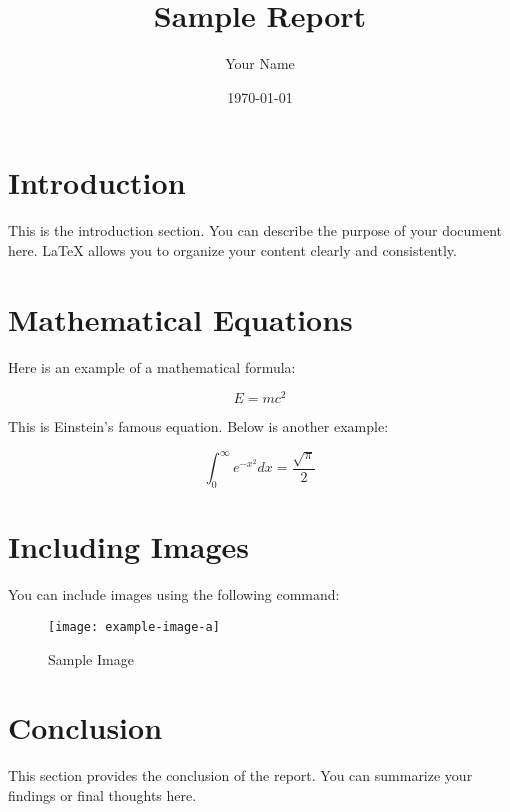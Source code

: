 \documentclass[a4paper,12pt]{article}  %
\title{Sample Report}
\author{Your Name}
\date{\today}  %
\begin{document}
\maketitle  %

\tableofcontents  %
\newpage  %

\section{Introduction}
This is the introduction section. You can describe the purpose of your document here. LaTeX allows you to organize your content clearly and consistently.

\section{Mathematical Equations}
Here is an example of a mathematical formula:

\begin{equation}
    E = mc^2
\end{equation}

This is Einstein's famous equation. Below is another example:

\[
    \int_0^\infty e^{-x^2} dx = \frac{\sqrt{\pi}}{2}
\]

\section{Including Images}
You can include images using the following command:

\begin{figure}[h!]
    \centering
    \texttt{[image: example-image-a]}  %
    \caption{Sample Image}
    \label{fig:sample}
\end{figure}

\section{Conclusion}
This section provides the conclusion of the report. You can summarize your findings or final thoughts here.
\end{document}

